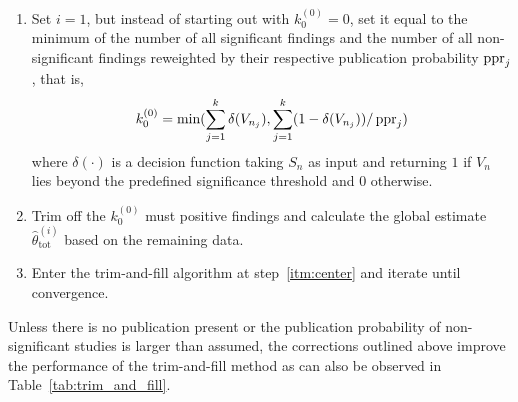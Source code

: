 \begin{enumerate}[start=1,label={2.\arabic*.}]
    \item Set $i = 1$, but instead of starting out with $k_0^{(0)} = 0$, set it equal to the minimum of the number of all significant findings and the number of all non-significant findings reweighted by their respective publication probability $\operatorname{\text{ppr}}_j$, that is,
    $$k_0^{(0)} = \text{min}(\sum_{j=1}^{k} \delta(V_{n_j}),\sum_{j=1}^{k} (1-\delta(V_{n_j}))/\operatorname{\text{ppr}}_j) $$
    where $\delta(\cdot)$ is a decision function taking $S_n$ as input and returning $1$ if $V_n$ lies beyond the predefined significance threshold and $0$ otherwise.
    \item Trim off the $k_0^{(0)}$ must positive findings and calculate the global estimate $\hat{\theta}_{\text{tot}}^{(i)}$ based on the remaining data.
    \item Enter the trim-and-fill algorithm at step~\ref{itm:center} and iterate until convergence.
\end{enumerate}
Unless there is no publication present or the publication probability of non-significant studies is larger than assumed, the corrections outlined above improve the performance of the trim-and-fill method as can also be observed in Table~\ref{tab:trim_and_fill}.

